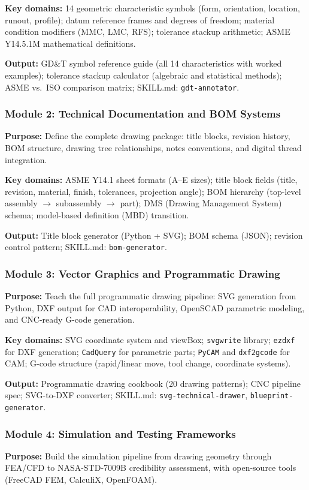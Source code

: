 \documentclass[11pt,letterpaper]{article}
\begin{document}
\textbf{Key domains:} 14 geometric characteristic symbols (form, orientation, location, runout, profile); datum reference frames and degrees of freedom; material condition modifiers (MMC, LMC, RFS); tolerance stackup arithmetic; ASME Y14.5.1M mathematical definitions.

\textbf{Output:} GD\&T symbol reference guide (all 14 characteristics with worked examples); tolerance stackup calculator (algebraic and statistical methods); ASME vs.\ ISO comparison matrix; SKILL.md: \texttt{gdt-annotator}.

\subsubsection{Module 2: Technical Documentation and BOM Systems}
\textbf{Purpose:} Define the complete drawing package: title blocks, revision history, BOM structure, drawing tree relationships, notes conventions, and digital thread integration.

\textbf{Key domains:} ASME Y14.1 sheet formats (A--E sizes); title block fields (title, revision, material, finish, tolerances, projection angle); BOM hierarchy (top-level assembly $\to$ subassembly $\to$ part); DMS (Drawing Management System) schema; model-based definition (MBD) transition.

\textbf{Output:} Title block generator (Python + SVG); BOM schema (JSON); revision control pattern; SKILL.md: \texttt{bom-generator}.

\subsubsection{Module 3: Vector Graphics and Programmatic Drawing}
\textbf{Purpose:} Teach the full programmatic drawing pipeline: SVG generation from Python, DXF output for CAD interoperability, OpenSCAD parametric modeling, and CNC-ready G-code generation.

\textbf{Key domains:} SVG coordinate system and viewBox; \texttt{svgwrite} library; \texttt{ezdxf} for DXF generation; \texttt{CadQuery} for parametric parts; \texttt{PyCAM} and \texttt{dxf2gcode} for CAM; G-code structure (rapid/linear move, tool change, coordinate systems).

\textbf{Output:} Programmatic drawing cookbook (20 drawing patterns); CNC pipeline spec; SVG-to-DXF converter; SKILL.md: \texttt{svg-technical-drawer}, \texttt{blueprint-generator}.

\subsubsection{Module 4: Simulation and Testing Frameworks}
\textbf{Purpose:} Build the simulation pipeline from drawing geometry through FEA/CFD to NASA-STD-7009B credibility assessment, with open-source tools (FreeCAD FEM, CalculiX, OpenFOAM).
\end{document}

